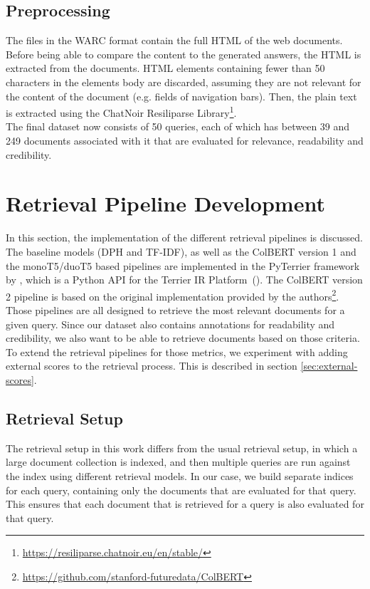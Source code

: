 \subsection{Preprocessing}
The files in the WARC format contain the full HTML of the web documents.
Before being able to compare the content to the generated answers, the HTML is extracted from the documents.
HTML elements containing fewer than 50 characters in the elements body are discarded, assuming they are not relevant for the content of the document (e.g. fields of navigation bars).
Then, the plain text is extracted using the ChatNoir Resiliparse Library\footnote{\url{https://resiliparse.chatnoir.eu/en/stable/}}.
\\
The final dataset now consists of 50 queries, each of which has between 39 and 249 documents associated with it that are evaluated for relevance, readability and credibility.


\section{Retrieval Pipeline Development}
In this section, the implementation of the different retrieval pipelines is discussed.
The baseline models (DPH and TF-IDF), as well as the ColBERT version 1 and the monoT5/duoT5 based pipelines are implemented in the PyTerrier framework by \cite{pyterrier:2020}, which is a Python API for the Terrier IR Platform~(\cite{macdonald:2012}).
The ColBERT version 2 pipeline is based on the original implementation provided by the authors\footnote{\url{https://github.com/stanford-futuredata/ColBERT}}.
\\
Those pipelines are all designed to retrieve the most relevant documents for a given query.
Since our dataset also contains annotations for readability and credibility, we also want to be able to retrieve documents based on those criteria.
To extend the retrieval pipelines for those metrics, we experiment with adding external scores to the retrieval process.
This is described in section \ref{sec:external-scores}.
\\

\subsection{Retrieval Setup}
The retrieval setup in this work differs from the usual retrieval setup, in which a large document collection is indexed, and then multiple queries are run against the index using different retrieval models.
In our case, we build separate indices for each query, containing only the documents that are evaluated for that query.
This ensures that each document that is retrieved for a query is also evaluated for that query.

